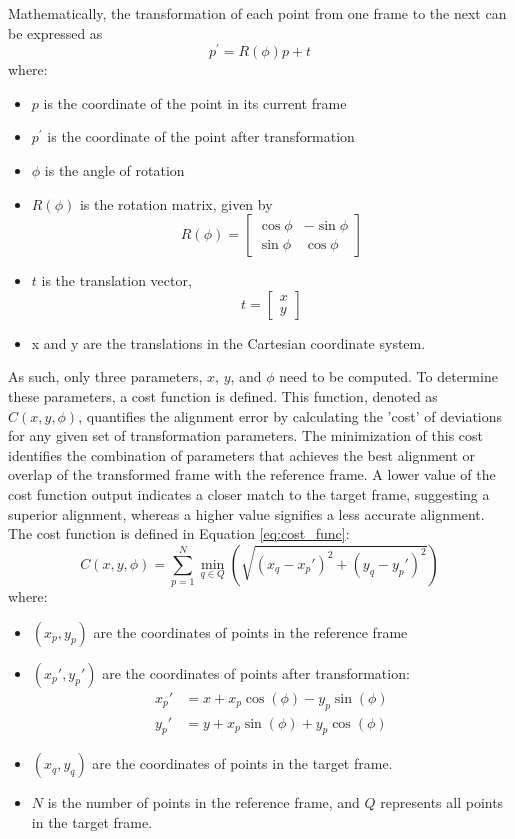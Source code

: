 \documentclass{micro-econ-thesis}
\begin{document}
Mathematically, the transformation of each point from one frame to the next can be expressed as 
\begin{equation}
	p^{'} = R(\phi)p + t
	\label{eq:rot} 
\end{equation}
where: 
\begin{itemize}
	\item \textbf{$p$} is the coordinate of the point in its current frame
	\item \textbf{$p^{'}$} is the coordinate of the point after transformation
	\item $\phi$ is the angle of rotation
	\item \textbf{$R(\phi)$}  is the rotation matrix, given by 
	 \[
	 R(\phi) = 
	 \begin{bmatrix}
	 	\cos \phi & -\sin \phi \\
	 	\sin \phi & \cos \phi
	 \end{bmatrix}
	 \]
	 
	 \item $t$ is the translation vector,
	 	\[
	 	t = \begin{bmatrix}
	 		x \\
	 		y
	 	\end{bmatrix}
	 	\]
 	\item x and y are the translations in the Cartesian coordinate system. 
\end{itemize}   
As such, only three parameters, $x$, $y$, and $\phi$ need to be computed. To determine these parameters, a cost function is defined. This function, denoted as $C(x,y,\phi)$, quantifies the alignment error by calculating the 'cost' of deviations for any given set of transformation parameters. The minimization of this cost identifies the combination of parameters that achieves the best alignment or overlap of the transformed frame with the reference frame. A lower value of the cost function output indicates a closer match to the target frame, suggesting a superior alignment, whereas a higher value signifies a less accurate alignment. The cost function is defined in Equation \ref{eq:cost_func}:  
\begin{equation}
	C(x, y, \phi) = \sum_{p=1}^{N} \min_{q \in Q} \left( \sqrt{(x_q - x_p')^2 + (y_q - y_p')^2} \right)
	\label{eq:cost_func}
\end{equation}
where:
\begin{itemize}
	\item $ (x_p, y_p) $ are the coordinates of points in the reference frame
	\item $(x_p', y_p')$ are the coordinates of points after transformation:
	\begin{align*}
		x_p' &= x + x_p \cos(\phi) - y_p \sin(\phi) \\
		y_p' &= y + x_p \sin(\phi) + y_p \cos(\phi)
	\end{align*}
	\item $(x_q, y_q)$ are the coordinates of points in the target frame.
	\item $N$ is the number of points in the reference frame, and $Q$ represents all points in the target frame.
\end{itemize}
\end{document}
